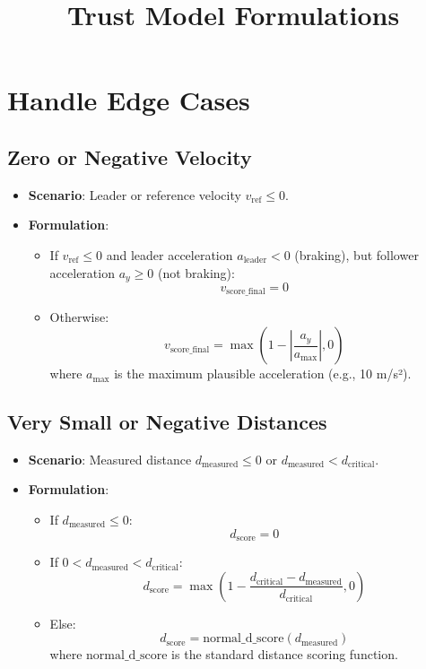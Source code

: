 \documentclass{article}
\title{Trust Model Formulations}
\author{}
\date{}
\begin{document}
\maketitle

\section{Handle Edge Cases}

\subsection{Zero or Negative Velocity}
\begin{itemize}
    \item \textbf{Scenario}: Leader or reference velocity $v_{\text{ref}} \leq 0$.
    \item \textbf{Formulation}:  
    \begin{itemize}
        \item If $v_{\text{ref}} \leq 0$ and leader acceleration $a_{\text{leader}} < 0$ (braking), but follower acceleration $a_y \geq 0$ (not braking):
        \[
        v_{\text{score\_final}} = 0
        \]
        \item Otherwise:
        \[
        v_{\text{score\_final}} = \max\left(1 - \left| \frac{a_y}{a_{\text{max}}} \right|, 0\right)
        \]
        where $a_{\text{max}}$ is the maximum plausible acceleration (e.g., 10 m/s²).
    \end{itemize}
\end{itemize}

\subsection{Very Small or Negative Distances}
\begin{itemize}
    \item \textbf{Scenario}: Measured distance $d_{\text{measured}} \leq 0$ or $d_{\text{measured}} < d_{\text{critical}}$.
    \item \textbf{Formulation}:
    \begin{itemize}
        \item If $d_{\text{measured}} \leq 0$:
        \[
        d_{\text{score}} = 0
        \]
        \item If $0 < d_{\text{measured}} < d_{\text{critical}}$:
        \[
        d_{\text{score}} = \max\left(1 - \frac{d_{\text{critical}} - d_{\text{measured}}}{d_{\text{critical}}}, 0\right)
        \]
        \item Else:
        \[
        d_{\text{score}} = \text{normal\_d\_score}(d_{\text{measured}})
        \]
        where $\text{normal\_d\_score}$ is the standard distance scoring function.
    \end{itemize}
\end{itemize}
\end{document}
